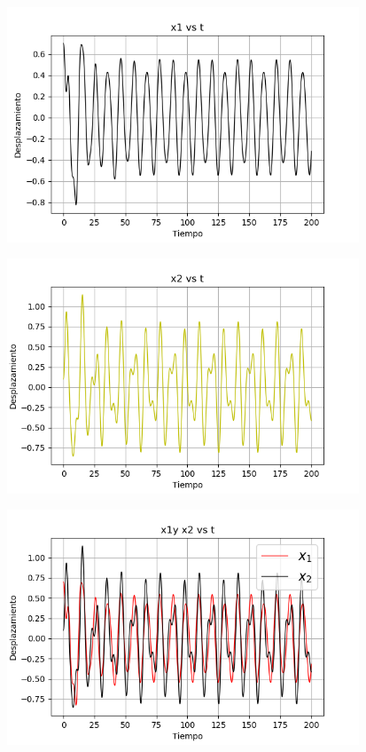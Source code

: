 \documentclass{article}
\begin{document}
\begin{center}
\includegraphics[height=7cm]{nolineal4_1_3.png}
\end{center}

\begin{center}
\includegraphics[height=7cm]{nolineal4_1_4.png}
\end{center}

\begin{center}
\includegraphics[height=7cm]{nolineal4_1_5.png}
\end{center}
\end{document}
